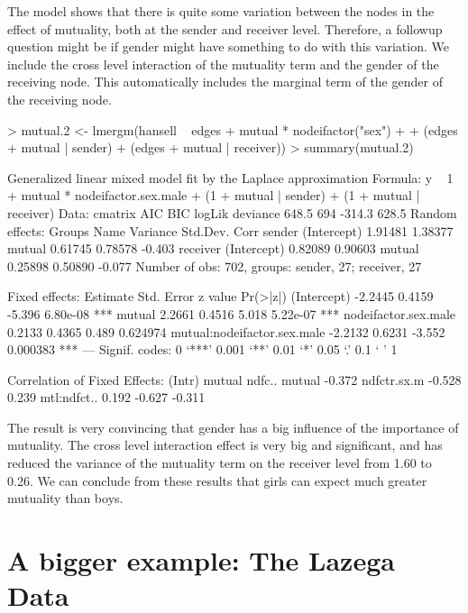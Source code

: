 \documentclass[a4paper]{article}
\begin{document}
The model shows that there is quite some variation between the nodes in the effect of mutuality, both at the sender and receiver level. 
Therefore, a followup question might be if gender might have something to do with this variation. We include the cross level interaction of 
the mutuality term and the gender of the receiving node. This automatically includes the marginal term of the gender of the receiving node.
\begin{Schunk}
\begin{Sinput}
> mutual.2 <- lmergm(hansell ~ edges + mutual * nodeifactor("sex") + 
+     (edges + mutual | sender) + (edges + mutual | receiver))
> summary(mutual.2)
\end{Sinput}
\begin{Soutput}
Generalized linear mixed model fit by the Laplace approximation 
Formula: y ~ 1 + mutual * nodeifactor.sex.male + (1 + mutual | sender) +      (1 + mutual | receiver) 
   Data: cmatrix 
   AIC BIC logLik deviance
 648.5 694 -314.3    628.5
Random effects:
 Groups   Name        Variance Std.Dev. Corr   
 sender   (Intercept) 1.91481  1.38377         
          mutual      0.61745  0.78578  -0.403 
 receiver (Intercept) 0.82089  0.90603         
          mutual      0.25898  0.50890  -0.077 
Number of obs: 702, groups: sender, 27; receiver, 27

Fixed effects:
                            Estimate Std. Error z value Pr(>|z|)    
(Intercept)                  -2.2445     0.4159  -5.396 6.80e-08 ***
mutual                        2.2661     0.4516   5.018 5.22e-07 ***
nodeifactor.sex.male          0.2133     0.4365   0.489 0.624974    
mutual:nodeifactor.sex.male  -2.2132     0.6231  -3.552 0.000383 ***
---
Signif. codes:  0 ‘***’ 0.001 ‘**’ 0.01 ‘*’ 0.05 ‘.’ 0.1 ‘ ’ 1 

Correlation of Fixed Effects:
            (Intr) mutual ndfc..
mutual      -0.372              
ndfctr.sx.m -0.528  0.239       
mtl:ndfct..  0.192 -0.627 -0.311
\end{Soutput}
\end{Schunk}
The result is very convincing that gender has a big influence of the importance of mutuality. The cross level interaction effect is very big
and significant, and has reduced the variance of the mutuality term on the receiver level from 1.60 to 0.26. 
We can conclude from these results that girls can expect much greater mutuality than boys.  


\section{A bigger example: The Lazega Data}
\label{section.lazega}
\end{document}
